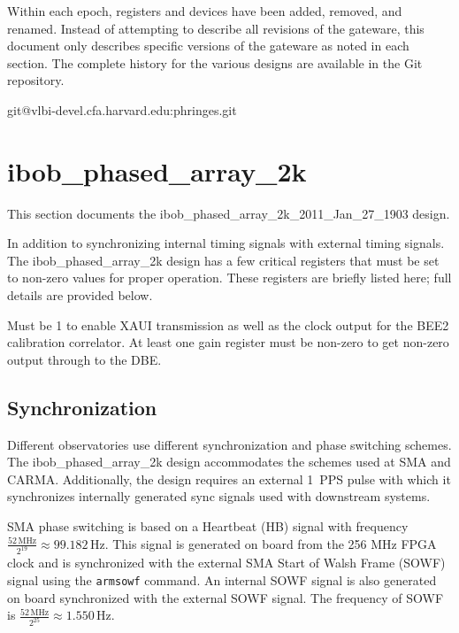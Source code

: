 \documentclass[12pt]{article}
\begin{document}
Within each epoch, registers and devices have been added, removed, and renamed.
Instead of attempting to describe all revisions of the gateware, this document
only describes specific versions of the gateware as noted in each section.  The
complete history for the various designs are available in the Git repository.

git@vlbi-devel.cfa.harvard.edu:phringes.git

\section{ibob\_phased\_array\_2k}

This section documents the ibob\_phased\_array\_2k\_2011\_Jan\_27\_1903 design.

In addition to synchronizing internal timing signals with external timing
signals.  The ibob\_phased\_array\_2k design has a few critical registers that
must be set to non-zero values for proper operation.  These registers are
briefly listed here; full details are provided below.

\begin{description}
 Must be 1 to enable XAUI transmission as well as the clock
output for the BEE2 calibration correlator.
 At least one gain register must be non-zero to get
non-zero output through to the DBE.
\end{description}

  \subsection{Synchronization}

Different observatories use different synchronization and phase switching
schemes.  The ibob\_phased\_array\_2k design accommodates the schemes used at
SMA and CARMA.  Additionally, the design requires an external 1~PPS pulse with
which it synchronizes internally generated sync signals used with downstream
systems.

SMA phase switching is based on a Heartbeat (HB) signal with frequency
$\frac{52 \, \mathrm{MHz}}{2^{19}} \approx 99.182 \, \mathrm{Hz}$.  This signal
is generated on board from the 256 MHz FPGA clock and is synchronized with the
external SMA Start of Walsh Frame (SOWF) signal using the \verb|armsowf|
command.  An internal SOWF signal is also generated on board synchronized with
the external SOWF signal.  The frequency of SOWF is $\frac{52 \,
\mathrm{MHz}}{2^{25}} \approx 1.550 \, \mathrm{Hz}$.
\end{document}
